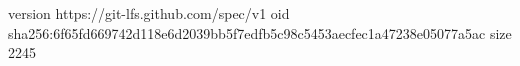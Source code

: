 version https://git-lfs.github.com/spec/v1
oid sha256:6f65fd669742d118e6d2039bb5f7edfb5c98c5453aecfec1a47238e05077a5ac
size 2245
